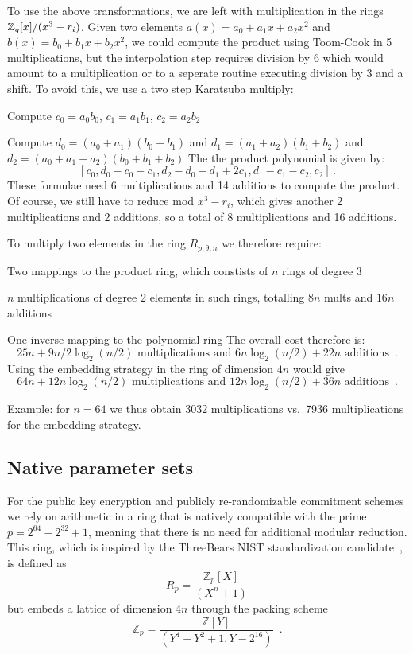 To use the above transformations, we are left with multiplication in the rings $\mathbb{Z}_q[x]/(x^3 - r_i)$.  Given
two elements $a(x) = a_0 + a_1 x + a_2 x^2$ and $b(x) = b_0 + b_1 x + b_2 x^2$, we could compute 
the product using Toom-Cook in 5 multiplications, but the interpolation step requires division by $6$
which would amount to a multiplication or to a seperate routine executing division by 3 and a shift.
To avoid this, we use a two step Karatsuba multiply:
\bit
\item Compute $c_0 = a_0b_0$, $c_1 = a_1 b_1$, $c_2 = a_2 b_2$
\item Compute $d_0 = (a_0 + a_1) (b_0 + b_1)$ and $d_1 = (a_1 + a_2)(b_1 + b_2)$ and $d_2 = (a_0 + a_1 + a_2)(b_0 + b_1 + b_2)$
\eit
The the product polynomial is given by:
\[
[c_0,  d_0 - c_0 - c_1,   d_2 - d_0 - d_1 + 2c_1,    d_1 - c_1 - c_2,   c_2] \, .
\]
These formulae need 6 multiplications and 14 additions to compute the product.  
Of course, we still have to reduce mod
$x^3 - r_i$, which gives another 2 multiplications and 2 additions, so a total of 8 multiplications and 16 additions.

To multiply two elements in the ring $R_{p, 9, n}$ we therefore require:
\bit
\item Two mappings to the product ring, which constists of $n$ rings of degree $3$
\item $n$ multiplications of degree 2 elements in such rings, totalling $8n$ mults and $16n$ additions
\item One inverse mapping to the polynomial ring
\eit
The overall cost therefore is:
\[   25n + 9n/2 \log_2(n/2) \text{ multiplications and }    6n \log_2(n/2) + 22 n \text{ additions } \, .   \]
Using the embedding strategy in the ring of dimension $4n$ would give
\[  64n + 12n \log_2(n/2) \text{ multiplications and }  12n \log_2(n/2) + 36n \text{ additions } \, . \]

Example: for $n = 64$ we thus obtain 3032 multiplications vs.\ 7936 multiplications for the embedding strategy.

\subsection{Native parameter sets}

For the public key encryption and publicly re-randomizable commitment schemes we rely on arithmetic in a ring that is natively compatible with the prime $p = 2^{64} - 2^{32} + 1$, meaning that there is no need for additional modular reduction. This ring, which is inspired by the ThreeBears NIST standardization candidate~\cite{}, is defined as 
$$ R_p = \frac{\mathbb{Z}_p[X]}{(X^n+1)} $$
but embeds a lattice of dimension $4n$ through the packing scheme
$$ \mathbb{Z}_p = \frac{\mathbb{Z}[Y]}{(Y^4 - Y^2 + 1, Y-2^{16})} \enspace .$$

